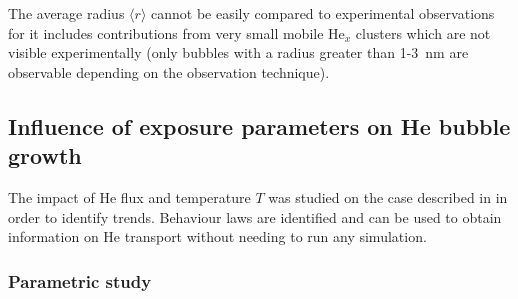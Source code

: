 The average radius $\langle r \rangle$ cannot be easily compared to experimental observations for it includes contributions from very small mobile He$_x$ clusters which are not visible experimentally (only bubbles with a radius greater than 1-\SI{3}{nm} are observable depending on the observation technique).

\subsection{Influence of exposure parameters on He bubble growth}
The impact of He flux and temperature $T$ was studied on the case described in  in order to identify trends.
Behaviour laws are identified and can be used to obtain information on He transport without needing to run any simulation.

\subsubsection{Parametric study} 

